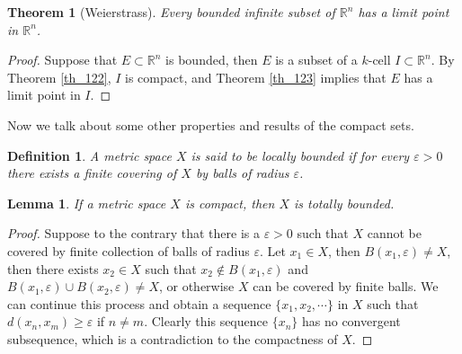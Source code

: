 \documentclass[11pt]{book}
\newtheorem{definition}{Definition}[chapter]
\newtheorem{theorem}{Theorem}[chapter]
\newtheorem{lemma}{Lemma}[chapter]
\theoremstyle{definition}
\numberwithin{equation}{chapter}
\begin{document}
\medskip

\begin{theorem}[Weierstrass]\label{}
Every bounded infinite subset of $\mathbb{R}^n$ has a limit point in $\mathbb{R}^n$.
\end{theorem}
\begin{proof}
Suppose that $E \subset \mathbb{R}^n$ is bounded, then $E$ is a subset of a $k$-cell $I \subset \mathbb{R}^n$. By Theorem \ref{th_122}, $I$ is compact, and Theorem \ref{th_123} implies that $E$ has a limit point in $I$.
\end{proof}

\medskip

Now we talk about some other properties and results of the compact sets.

\medskip

\begin{definition}
A metric space $X$ is said to be locally bounded if for every $\varepsilon > 0$ there exists a finite covering of $X$ by balls of radius $\varepsilon$.
\end{definition}

\medskip

\begin{lemma}
If a metric space $X$ is compact, then $X$ is totally bounded.
\end{lemma}
\begin{proof}
Suppose to the contrary that there is a $\varepsilon > 0$ such that $X$ cannot be covered by finite collection of balls of radius $\varepsilon$. Let $x_1 \in X$, then $B(x_1,\varepsilon) \neq X$, then there exists $x_2 \in X$ such that $x_2 \notin B(x_1,\varepsilon)$ and $B(x_1,\varepsilon) \cup B(x_2,\varepsilon) \neq X$, or otherwise $X$ can be covered by finite balls. We can continue this process and obtain a sequence $\{x_1, x_2, \cdots\}$ in $X$ such that $d(x_n,x_m) \geq \varepsilon$ if $n \neq m$. Clearly this sequence $\{x_n\}$ has no convergent subsequence, which is a contradiction to the compactness of $X$.
\end{proof}

\medskip
\end{document}
